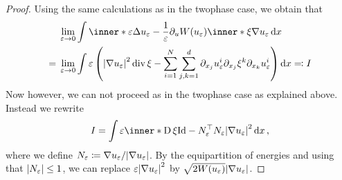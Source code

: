 \begin{proof}
	Using the same calculations as in the twophase case, we obtain that
	\begin{align*}
		& \lim_{ \varepsilon \to 0 }
			\int
				\inner*{
					\varepsilon \Delta u_{ \varepsilon }
					-
					\frac{ 1 }{ \varepsilon } \partial_{ u } W ( u_{ \varepsilon } )
				}
				{
					\inner*{ \xi }{ \nabla u_{ \varepsilon } }
				}
			\dd{ x }
		\\
		={} &
		\lim_{ \varepsilon \to 0 }
			\int
				\varepsilon
				\left(
					\abs{ \nabla u_{ \varepsilon } }^{ 2 }
					\divg \xi 
					-
					\sum_{ i = 1 }^{ N }
						\sum_{ j, k = 1 }^{ d }
							\partial_{ x_{ j } } u_{ \varepsilon }^{ i }
							\partial_{ x_{ j } } \xi^{ k }
							\partial_{ x_{ k } } u_{ \varepsilon }^{ i }
				\right)
			\dd{ x } 
			\eqqcolon I
	\end{align*}
	Now however, we can not proceed as in the twophase case as explained above. 
	Instead we rewrite
	\begin{equation*}
		I
		=
		\int
			\varepsilon
			\inner*{
				\diff \xi 
			}
			{
				\mathrm{Id} - N_{ \varepsilon }^{ \top } N_{ \varepsilon }
			}
			\abs{ \nabla u_{ \varepsilon } }^{ 2 }
		\dd{ x },
	\end{equation*}
	where we define $ N_{ \varepsilon } \coloneqq \nabla u_{ \varepsilon } / \abs{ \nabla u_{ \varepsilon } } $. By the equipartition of energies  and using that $ \abs{N_{ \varepsilon } } \leq 1 $, we can replace $ \varepsilon \abs{ \nabla u_{ \varepsilon } }^{ 2 } $ by $ \sqrt{ 2 W ( u_{ \varepsilon } ) } \abs{ \nabla u_{ \varepsilon  } } $. 
	

\end{proof}
